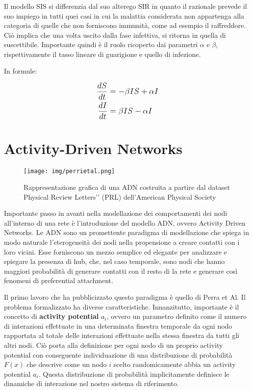 \documentclass[12pt,twoside]{report}
\begin{document}
	Il modello SIS \cite{Pugliese} si differenzia dal suo alterego SIR in quanto il razionale prevede il suo impiego in tutti quei casi in cui la malattia considerata non appartenga alla categoria di quelle che non forniscono immunità, come ad esempio il raffreddore. Ciò implica che una volta uscito dalla fase infettiva, si ritorna in quella di suscettibile. Importante quindi è il ruolo ricoperto dai parametri $\alpha$ e $\beta$, rispettivamente il tasso lineare di guarigione e quello di infezione.
	
	In formule:
	
    \begin{subequations}
    \label{eq2}
    \large
        \begin{align}
            \frac{dS}{dt} & = -\beta IS + \alpha I \label{eq111} 
            \\
            \frac{dI}{dt} & = \beta IS - \alpha I \label{eq222}
        \end{align}
    \end{subequations}\clearpage
    
\section{Activity-Driven Networks}	
	\vskip 20pt
	\begin{figure}[htb]
		\centering
		\texttt{[image: img/perrietal.png]}
		\caption{Rappresentazione grafica di una ADN costruita a partire dal dataset Physical Review Letters’’ (PRL) dell'American Physical Society}\label{fig:1}
	\end{figure}
	\vskip 20pt
	
	Importante passo in avanti nella modellazione dei comportamenti dei nodi all'interno di una rete è l'introduzione del modello ADN, ovvero Activity Driven Networks. Le ADN sono un promettente paradigma di modellazione che spiega in modo naturale l'eterogeneità dei nodi nella propensione a creare contatti con i loro vicini. Esse forniscono un mezzo semplice ed elegante per analizzare e spiegare la presenza di hub, che, nel caso temporale, sono nodi che hanno maggiori probabilità di generare contatti con il resto di la rete e generare così fenomeni di preferential attachment.
	
	\vskip 12pt
	
	Il primo lavoro che ha pubblicizzato questo paradigma è quello di Perra et Al.\cite{Perra} Il problema formalizzato ha diverse caratteristiche. Innanzitutto, importante è il concetto di \textbf{activity potential} $a_i$, ovvero un parametro definito come il numero di interazioni effettuate in una determinata finestra temporale da ogni nodo rapportata al totale delle interazioni effettuate nella stessa finestra da tutti gli altri nodi. Ciò porta alla definizione per ogni nodo di un proprio activity potential con conseguente individuazione di una distribuzione di probabilità $F(x)$ che descrive come un nodo $i$ scelto randomicamente abbia un activity potential $a_i$. Questa distribuzione di probabilità implicitamente definisce le dinamiche di interazione nel nostro sistema di riferimento.
\end{document}
